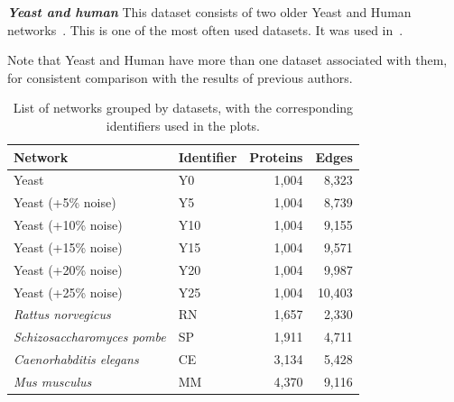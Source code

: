 \documentclass{bioinfo}
\begin{document}
\emph{\textbf{Yeast and human}} This dataset consists of two older Yeast and Human networks~\citep{Collins01032007,humanNetwork}. This is one of the most often used datasets. It was used in~\citep{GRAAL,NETAL,MAGNA,MIGRAAL}. 

Note that Yeast and Human have more than one dataset associated with them, for consistent comparison with the results of previous authors.
\begin{table}[h]
\label{networkTable}
\caption{List of networks grouped by datasets, with the corresponding identifiers used in the plots.}
\begin{tabular}{llrr}
\hline
\textbf{Network}                   & \textbf{Identifier} & \multicolumn{1}{l}{\textbf{Proteins}} & \multicolumn{1}{l}{\textbf{Edges}} \\ \hline
Yeast                              & Y0                  & 1,004                                 & 8,323                                     \\
Yeast (+5\% noise)                 & Y5                  & 1,004                                 & 8,739                                     \\
Yeast (+10\% noise)                & Y10                 & 1,004                                 & 9,155                                     \\
Yeast (+15\% noise)                & Y15                 & 1,004                                 & 9,571                                     \\
Yeast (+20\% noise)                & Y20                 & 1,004                                 & 9,987                                     \\
Yeast (+25\% noise)                & Y25                 & 1,004                                 & 10,403                                    \\ \hline
\textit{Rattus norvegicus}         & RN                  & 1,657                                 & 2,330                                     \\
\textit{Schizosaccharomyces pombe} & SP                  & 1,911                                 & 4,711                                     \\
\textit{Caenorhabditis elegans}    & CE                  & 3,134                                 & 5,428                                     \\
\textit{Mus musculus}              & MM                  & 4,370                                 & 9,116                                     \\

\end{tabular}
\end{table}
\end{document}
